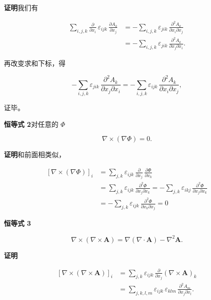 \documentclass[11pt,a4paper,oneside]{ctexbook}
\newcommand{\ve}[1]{\bm{#1}}
\begin{document}
\textbf{证明}\quad 我们有

\begin{equation*}
\begin{aligned}
\sum_{i,j,k} \frac{\partial}{\partial x_i}\, \varepsilon_{ijk}\, \frac{\partial A_k}{\partial x_j}
&= -\sum_{i,j,k} \varepsilon_{jik}\, \frac{\partial^{2} A_k}{\partial x_i \partial x_j}\\
&= -\sum_{i,j,k} \varepsilon_{jik}\, \frac{\partial^{2} A_k}{\partial x_j \partial x_i}.
\end{aligned}
\end{equation*}

再改变求和下标，得

\begin{equation*}
-\sum_{i,j,k} \varepsilon_{jik}\, \frac{\partial^{2} A_k}{\partial x_j \partial x_i}
= -\sum_{i,j,k} \varepsilon_{ijk}\, \frac{\partial^{2} A_k}{\partial x_i \partial x_j},
\end{equation*}

证毕。

\textbf{恒等式 2}\quad 对任意的 $\Phi$

\begin{equation}
\nabla \times (\nabla\Phi) = 0.
\tag{1.32}
\end{equation}

\textbf{证明}\quad 和前面相类似，

\begin{equation*}
\begin{aligned}
[\nabla \times (\nabla\Phi)]_i &= \sum_{j,k} \varepsilon_{ijk}\, \frac{\partial}{\partial x_j}\, \frac{\partial\Phi}{\partial x_k}\\
&= \sum_{j,k} \varepsilon_{ijk}\, \frac{\partial^{2}\Phi}{\partial x_j \partial x_k}
 = -\sum_{j,k} \varepsilon_{ikj}\, \frac{\partial^{2}\Phi}{\partial x_j \partial x_k}\\
&= -\sum_{j,k} \varepsilon_{ijk}\, \frac{\partial^{2}\Phi}{\partial x_k \partial x_j} = 0
\end{aligned}
\end{equation*}

\textbf{恒等式 3}\quad

\begin{equation}
\nabla \times (\nabla \times \ve{A}) = \nabla(\nabla \cdot \ve{A}) - \nabla^{2}\ve{A}.
\tag{1.33}
\end{equation}

\textbf{证明}\quad

\begin{equation*}
\begin{aligned}
[\nabla \times (\nabla \times \ve{A})]_i &= \sum_{j,k} \varepsilon_{ijk}\, \frac{\partial}{\partial x_j} (\nabla \times \ve{A})_k\\
&= \sum_{j,k,l,m} \varepsilon_{ijk}\, \varepsilon_{klm}\, \frac{\partial^{2} A_m}{\partial x_j \partial x_l}.
\end{aligned}
\end{equation*}
\end{document}
